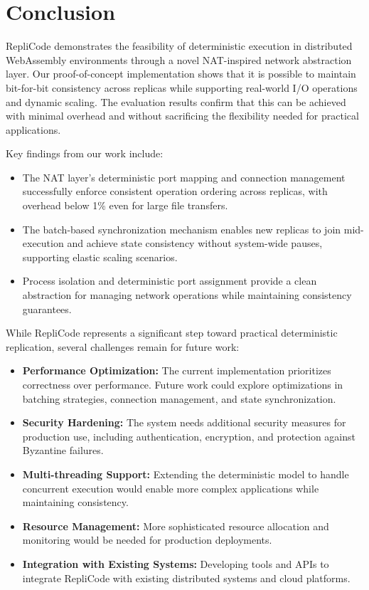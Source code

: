 \documentclass[10pt, 
]{IEEEtran}
\begin{document}
\section{Conclusion}
RepliCode demonstrates the feasibility of deterministic execution in distributed WebAssembly environments through a novel NAT-inspired network abstraction layer. Our proof-of-concept implementation shows that it is possible to maintain bit-for-bit consistency across replicas while supporting real-world I/O operations and dynamic scaling. The evaluation results confirm that this can be achieved with minimal overhead and without sacrificing the flexibility needed for practical applications.

Key findings from our work include:
\begin{itemize}
    \item The NAT layer's deterministic port mapping and connection management successfully enforce consistent operation ordering across replicas, with overhead below 1\% even for large file transfers.
    \item The batch-based synchronization mechanism enables new replicas to join mid-execution and achieve state consistency without system-wide pauses, supporting elastic scaling scenarios.
    \item Process isolation and deterministic port assignment provide a clean abstraction for managing network operations while maintaining consistency guarantees.
\end{itemize}

While RepliCode represents a significant step toward practical deterministic replication, several challenges remain for future work:
\begin{itemize}
    \item \textbf{Performance Optimization:} The current implementation prioritizes correctness over performance. Future work could explore optimizations in batching strategies, connection management, and state synchronization.
    \item \textbf{Security Hardening:} The system needs additional security measures for production use, including authentication, encryption, and protection against Byzantine failures.
    \item \textbf{Multi-threading Support:} Extending the deterministic model to handle concurrent execution would enable more complex applications while maintaining consistency.
    \item \textbf{Resource Management:} More sophisticated resource allocation and monitoring would be needed for production deployments.
    \item \textbf{Integration with Existing Systems:} Developing tools and APIs to integrate RepliCode with existing distributed systems and cloud platforms.
\end{itemize}
\end{document}
